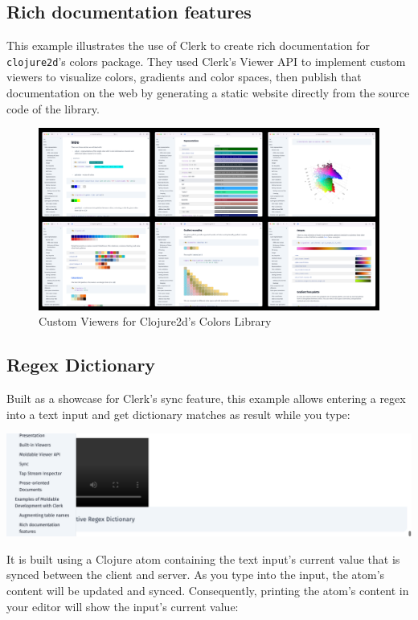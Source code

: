 \documentclass[sigconf,screen]{acmart}
\newcommand{\passthrough}[1]{#1}
\begin{document}
\hypertarget{id}{%
\subsection{Rich documentation features}\label{id}}

This example illustrates the use of Clerk to create rich documentation for \passthrough{\lstinline!clojure2d!}'s colors package. They used Clerk's Viewer API to implement custom viewers to visualize colors, gradients and color spaces, then publish that documentation on the web by generating a static website directly from the source code of the library.

\begin{figure}[H]
\centering
\includegraphics{images/custom-viewers-for-clojure2ds-colors-library.png}
\caption{Custom Viewers for Clojure2d's Colors Library}
\end{figure}

\hypertarget{id}{%
\subsection{Regex Dictionary}\label{id}}

Built as a showcase for Clerk's sync feature, this example allows entering a regex into a text input and get dictionary matches as result while you type:

\includegraphics{images/result-anon-expr-5dtM22Yf1xRBnb3AupxNJkvJ86QR6P.png}

It is built using a Clojure atom containing the text input's current value that is synced between the client and server. As you type into the input, the atom's content will be updated and synced. Consequently, printing the atom's content in your editor will show the input's current value:
\end{document}
